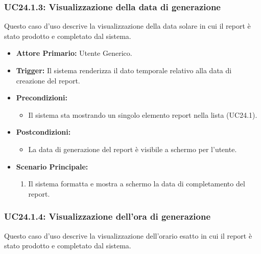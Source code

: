 \documentclass[12pt, a4paper]{article}
\begin{document}
\subsubsection{UC24.1.3: Visualizzazione della data di generazione}\label{uc:24.1.3}
Questo caso d'uso descrive la visualizzazione della data solare in cui il report è stato prodotto e completato dal sistema.

\begin{itemize}
    \item \textbf{Attore Primario:} Utente Generico.
    \item \textbf{Trigger:} Il sistema renderizza il dato temporale relativo alla data di creazione del report.
    \item \textbf{Precondizioni:}
    \begin{itemize}
        \item Il sistema sta mostrando un singolo elemento report nella lista (UC24.1).
    \end{itemize}
    \item \textbf{Postcondizioni:}
    \begin{itemize}
        \item La data di generazione del report è visibile a schermo per l'utente.
    \end{itemize}
    \item \textbf{Scenario Principale:}
    \begin{enumerate}
        \item Il sistema formatta e mostra a schermo la data di completamento del report.
    \end{enumerate}
\end{itemize}

\subsubsection{UC24.1.4: Visualizzazione dell'ora di generazione}\label{uc:24.1.4}
Questo caso d'uso descrive la visualizzazione dell'orario esatto in cui il report è stato prodotto e completato dal sistema.
\end{document}
